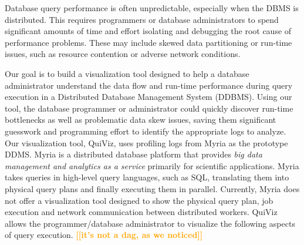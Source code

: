 \documentclass{chi2009}
\newcommand*{\system}{QuiViz\xspace}
\newcommand{\todo}[1]{\textsf{\textbf{\textcolor{Orange}{[[#1]]}}}}
\begin{document}
Database query performance is often unpredictable, especially when the DBMS is
distributed. This requires programmers or database administrators to spend
significant amounts of time and effort isolating and debugging the root cause
of performance problems. These may include skewed data partitioning or run-time
issues, such as resource contention or adverse network conditions.

Our goal is to build a visualization tool designed to help a database administrator understand the data flow and run-time
performance during query execution in a Distributed Database Management System (DDBMS). Using our tool, the
database programmer or administrator could quickly discover run-time bottlenecks as well as problematic data skew issues,
saving them significant guesswork and programming effort to identify the appropriate logs to analyze. Our visualization tool,
\system, uses profiling logs from Myria as the prototype DDMS. Myria is a distributed
database platform that provides \emph{big data management and analytics as a service} primarily for scientific applications.
Myria takes queries in high-level query languages, such as SQL, translating them into physical query plans and finally executing
them in parallel. Currently, Myria does not offer a visualization tool designed to show the physical query plan, job execution and network
communication between distributed workers. \system allows the programmer/database administrator to visualize the following aspects
of query execution.
\todo{it's not a dag, as we noticed}
\end{document}
